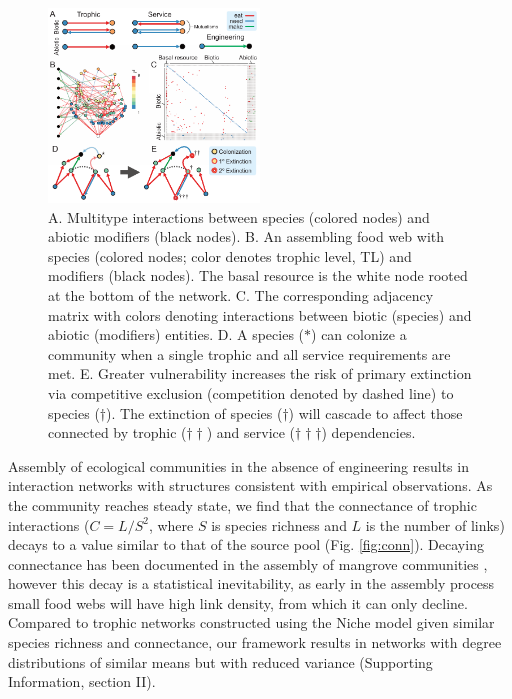\documentclass[9pt,twocolumn,twoside]{pnas-new}
\begin{document}
\begin{figure}[h!]
\centering
\includegraphics[width=0.5\textwidth]{fig_model.pdf}
\vspace{-6mm}
\caption{
A. Multitype interactions between species (colored nodes) and abiotic modifiers (black nodes).
B. An assembling food web with species (colored nodes; color denotes trophic level, TL) and modifiers (black nodes). The basal resource is the white node rooted at the bottom of the network.
C. The corresponding adjacency matrix with colors denoting interactions between biotic (species) and abiotic (modifiers) entities.
D. A species ($\ast$) can colonize a community when a single trophic and all service requirements are met.
E. Greater vulnerability increases the risk of primary extinction via competitive exclusion (competition denoted by dashed line) to species ($\dag$).
The extinction of species ($\dag$) will cascade to affect those connected by trophic ($\dag \dag$) and service ($\dag \dag \dag$) dependencies. 
\vspace{-3mm}
}
\vspace{-3mm}
\label{fig:model}
\end{figure}

Assembly of ecological communities in the absence of engineering results in interaction networks with structures consistent with empirical observations.
As the community reaches steady state, we find that the connectance of trophic interactions ($C=L/S^2$, where $S$ is species richness and $L$ is the number of links) decays to a value similar to that of the source pool (Fig. \ref{fig:conn}).
Decaying connectance has been documented in the assembly of mangrove communities \cite{Piechnik2008}, however this decay is a statistical inevitability, as early in the assembly process small food webs will have high link density, from which it can only decline.
Compared to trophic networks constructed using the Niche model \cite{Williams2000} given similar species richness and connectance, our framework results in networks with degree distributions of similar means but with reduced variance (Supporting Information, section II).
\end{document}
